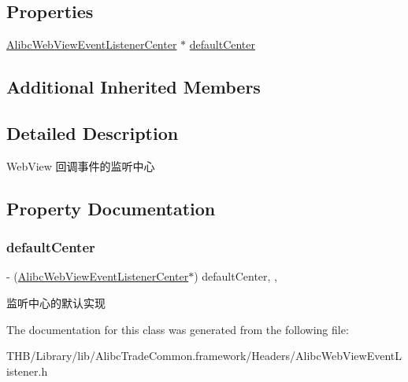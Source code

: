 \subsection*{Properties}
\begin{DoxyCompactItemize}
\item 
\mbox{\hyperlink{interface_alibc_web_view_event_listener_center}{Alibc\+Web\+View\+Event\+Listener\+Center}} $\ast$ \mbox{\hyperlink{interface_alibc_web_view_event_listener_center_a07c4350b72e88b70b04702da7baf4110}{default\+Center}}
\end{DoxyCompactItemize}
\subsection*{Additional Inherited Members}


\subsection{Detailed Description}
Web\+View 回调事件的监听中心 

\subsection{Property Documentation}
\mbox{\label{interface_alibc_web_view_event_listener_center_a07c4350b72e88b70b04702da7baf4110}} 
\subsubsection{\texorpdfstring{default\+Center}{defaultCenter}}
{\footnotesize\ttfamily -\/ (\mbox{\hyperlink{interface_alibc_web_view_event_listener_center}{Alibc\+Web\+View\+Event\+Listener\+Center}}$\ast$) default\+Center\hspace{0.3cm}{\ttfamily [read]}, {\ttfamily [atomic]}, {\ttfamily [strong]}}

监听中心的默认实现 

The documentation for this class was generated from the following file\+:\begin{DoxyCompactItemize}
\item 
T\+H\+B/\+Library/lib/\+Alibc\+Trade\+Common.\+framework/\+Headers/Alibc\+Web\+View\+Event\+Listener.\+h\end{DoxyCompactItemize}
